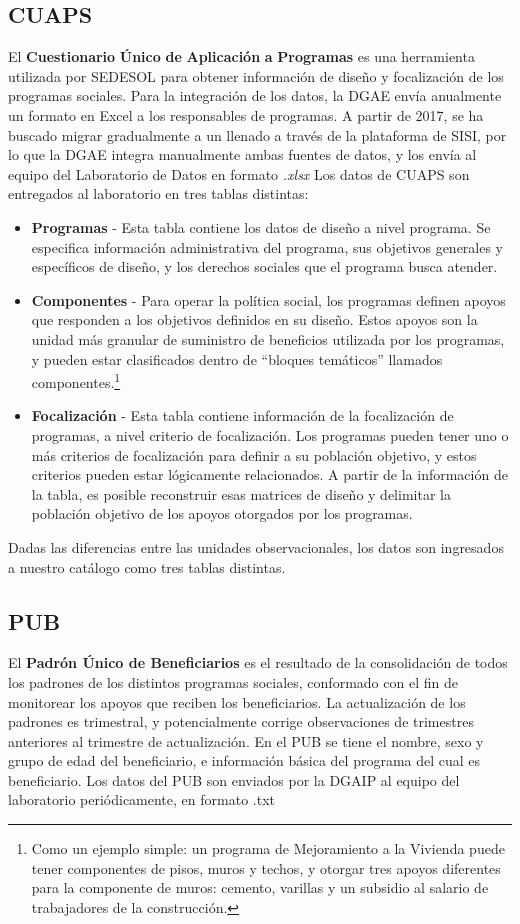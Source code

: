 \subsection*{CUAPS}
El \textbf{Cuestionario} \textbf{Único} \textbf{de} \textbf{Aplicación} \textbf{a} \textbf{Programas} es una herramienta utilizada por SEDESOL para obtener información de diseño y focalización de  los programas sociales. Para la integración de los datos, la DGAE envía anualmente un formato en Excel a los responsables de programas. A partir de 2017, se ha buscado migrar gradualmente a un llenado a través de la plataforma de SISI, por lo que la DGAE integra manualmente ambas fuentes de datos, y los envía al equipo del Laboratorio de Datos en formato \textit{.xlsx} Los datos de CUAPS son entregados al laboratorio en tres tablas distintas:
\begin{itemize}
    \item \textbf{Programas} - Esta tabla contiene los datos de diseño a nivel programa. Se especifica información administrativa del programa, sus objetivos generales y específicos de diseño, y los derechos sociales que el programa busca atender.
    \item \textbf{Componentes} - Para operar la política social, los programas definen apoyos que responden a los objetivos definidos en su diseño. Estos apoyos son la unidad más granular de suministro de beneficios utilizada por los programas, y pueden estar clasificados dentro de “bloques temáticos” llamados componentes.\footnote{Como un ejemplo simple: un programa de Mejoramiento a la Vivienda puede tener componentes de pisos, muros y techos, y otorgar tres apoyos diferentes para la componente de muros: cemento, varillas y un subsidio al salario de trabajadores de la construcción.}
    \item \textbf{Focalización} - Esta tabla contiene información de la focalización de programas, a nivel criterio de focalización. Los programas pueden tener uno o más criterios de focalización para definir a su población objetivo, y estos criterios pueden estar lógicamente relacionados. A partir de la información de la tabla, es posible reconstruir esas matrices de diseño y delimitar la población objetivo de los apoyos otorgados por los programas.
\end{itemize}
Dadas las diferencias entre las unidades observacionales, los datos son ingresados a nuestro catálogo como tres tablas distintas.
\subsection*{PUB}
El \textbf{Padrón Único de Beneficiarios} es el resultado de la consolidación de todos los padrones de los distintos programas sociales, conformado con el fin de monitorear los apoyos que reciben los beneficiarios. La actualización de los padrones es trimestral, y potencialmente corrige observaciones de trimestres anteriores al trimestre de actualización. En el PUB se tiene el nombre, sexo y grupo de edad del beneficiario, e información básica del programa del cual es beneficiario. Los datos del PUB son enviados por la DGAIP al equipo del laboratorio periódicamente, en formato .txt
